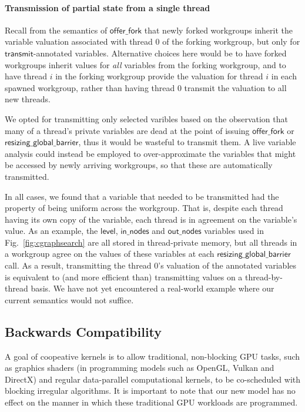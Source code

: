 \documentclass[numbers,nocopyrightspace,10pt]{sigplanconf}
\newcommand{\myfig}{Fig.~}
\newcommand{\transmit}{\mathsf{transmit}}
\newcommand{\offerfork}{\mathsf{offer\_fork}}
\newcommand{\resizingglobalbarrier}{\mathsf{resizing\_global\_barrier}}
\newcommand{\keyword}[1]{\mathsf{#1}}
\begin{document}
\paragraph{Transmission of partial state from a single thread}

Recall from the semantics of $\offerfork$ that newly forked workgroups
inherit the variable valuation associated with thread 0 of the forking
workgroup, but only for $\transmit$-annotated variables.  Alternative
choices here would be to have forked workgroups inherit values for
\emph{all} variables from the forking workgroup, and to have thread
$i$ in the forking workgroup provide the valuation for thread $i$ in
each spawned workgroup, rather than having thread 0 transmit the
valuation to all new threads.

We opted for transmitting only selected varibles based on the
observation that many of a thread's private variables are dead at the
point of issuing $\offerfork$ or $\resizingglobalbarrier$, thus it
would be wasteful to transmit them.  A live variable analysis could
instead be employed to over-approximate the variables that might be
accessed by newly arriving workgroups, so that these are automatically
transmitted.

In all cases, we found that a variable that needed to be transmitted
had the property of being uniform across the workgroup.  That is,
despite each thread having its own copy of the variable, each thread
is in agreement on the variable's value.  As an example, the
$\keyword{level}$, $\keyword{in\_nodes}$ and $\keyword{out\_nodes}$
variables used in \myfig\ref{fig:cgraphsearch} are all stored in thread-private
memory, but all threads in a workgroup agree on the values of these
variables at each $\resizingglobalbarrier$ call.  As a result,
transmitting the thread 0's valuation of the annotated variables is
equivalent to (and more efficient than) transmitting values on a
thread-by-thread basis.  We have not yet encountered a real-world
example where our current semantics would not suffice.



\subsection{Backwards Compatibility}\label{sec:backwardscompatibility}

A goal of coopeative kernels is to allow traditional, non-blocking GPU
tasks, such as graphics shaders (in programming models such as OpenGL,
Vulkan and DirectX) and regular data-parallel computational kernels,
to be co-scheduled with blocking irregular algorithms.  It is
important to note that our new model has no effect on the manner in
which these traditional GPU workloads are programmed.
\end{document}
